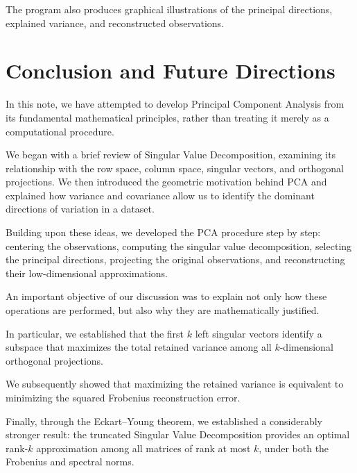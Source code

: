 \documentclass[11pt]{article}
\begin{document}
The program also produces graphical illustrations
of the principal directions, explained variance,
and reconstructed observations.




\section{Conclusion and Future Directions}

In this note, we have attempted to develop
Principal Component Analysis from its
fundamental mathematical principles,
rather than treating it merely as a
computational procedure.

We began with a brief review of Singular
Value Decomposition, examining its
relationship with the row space, column
space, singular vectors, and orthogonal
projections. We then introduced the
geometric motivation behind PCA and
explained how variance and covariance
allow us to identify the dominant
directions of variation in a dataset.

Building upon these ideas, we developed
the PCA procedure step by step:
centering the observations, computing
the singular value decomposition,
selecting the principal directions,
projecting the original observations,
and reconstructing their low-dimensional
approximations.

An important objective of our discussion
was to explain not only how these
operations are performed, but also
why they are mathematically justified.

In particular, we established that
the first $k$ left singular vectors
identify a subspace that maximizes
the total retained variance among all
$k$-dimensional orthogonal projections.

We subsequently showed that maximizing
the retained variance is equivalent
to minimizing the squared Frobenius
reconstruction error.

Finally, through the Eckart--Young theorem,
we established a considerably stronger
result: the truncated Singular Value
Decomposition provides an optimal
rank-$k$ approximation among all matrices
of rank at most $k$, under both the
Frobenius and spectral norms.
\end{document}
